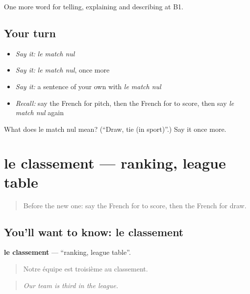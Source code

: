\begin{grammarlens}[title={What you've built}]
One more word for telling, explaining and describing at B1.
\end{grammarlens}

\subsection*{Your turn}
\begin{itemize}
\raggedright
  \item \emph{Say it:} \emph{le match nul}
  \item \emph{Say it:} \emph{le match nul}, once more
  \item \emph{Say it:} a sentence of your own with \emph{le match nul}
  \item \emph{Recall:} say the French for pitch, then the French for to score, then say \emph{le match nul} again
\end{itemize}

\begin{tcolorbox}[breakable,colback=teal!4,colframe=teal!35!black,title={Before you move on}]
What does le match nul mean? (\textquotedblleft{}Draw, tie (in sport)\textquotedblright{}.) Say it once more.
\end{tcolorbox}
\section[le classement]{le classement — ranking, league table}

\label{lesson:FR-C506-classement}



\begin{quote}
Before the new one: say the French for to score, then the French for draw.
\end{quote}

\subsection*{You'll want to know: le classement}
\textbf{le classement} — \textquotedblleft{}ranking, league table\textquotedblright{}.

\begin{quote}
Notre équipe est troisième au classement.
\end{quote}

\begin{quote}
\emph{Our team is third in the league.}
\end{quote}

